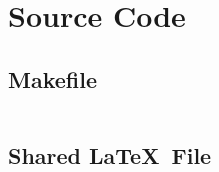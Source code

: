 \chapter{Source Code}

\section{Makefile}
\inputminted[fontsize=\small,breaklines]{make}{Makefile}

\section{Shared \LaTeX\ File}
\inputminted[fontsize=\small,breaklines]{latex}{shared.tex}

